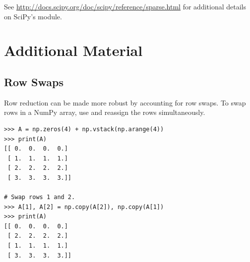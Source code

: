 See \url{http://docs.scipy.org/doc/scipy/reference/sparse.html} for additional details on SciPy's  module.

\newpage

\section*{Additional Material} %

\subsection*{Row Swaps} %

Row reduction can be made more robust by accounting for row swaps.
To swap rows in a NumPy array, use  and reassign the rows simultaneously.

\begin{lstlisting}
>>> A = np.zeros(4) + np.vstack(np.arange(4))
>>> print(A)
[[ 0.  0.  0.  0.]
 [ 1.  1.  1.  1.]
 [ 2.  2.  2.  2.]
 [ 3.  3.  3.  3.]]

# Swap rows 1 and 2.
>>> A[1], A[2] = np.copy(A[2]), np.copy(A[1])
>>> print(A)
[[ 0.  0.  0.  0.]
 [ 2.  2.  2.  2.]
 [ 1.  1.  1.  1.]
 [ 3.  3.  3.  3.]]
\end{lstlisting}


